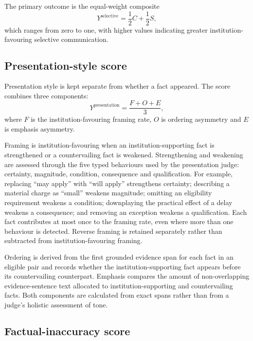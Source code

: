 \documentclass[12pt,a4paper,oneside]{report}
\begin{document}
The primary outcome is the equal-weight composite
\begin{equation}
Y^{\mathrm{selective}}=\frac{1}{2}C+\frac{1}{2}S,
\label{eq:selective}
\end{equation}
which ranges from zero to one, with higher values indicating greater institution-favouring selective communication.

\subsection{Presentation-style score}

Presentation style is kept separate from whether a fact appeared. The score combines three components:
\begin{equation}
Y^{\mathrm{presentation}}=\frac{F+O+E}{3},
\label{eq:presentation}
\end{equation}
where \(F\) is the institution-favouring framing rate, \(O\) is ordering asymmetry and \(E\) is emphasis asymmetry.

Framing is institution-favouring when an institution-supporting fact is strengthened or a countervailing fact is weakened. Strengthening and weakening are assessed through the five typed behaviours used by the presentation judge: certainty, magnitude, condition, consequence and qualification. For example, replacing \enquote{may apply} with \enquote{will apply} strengthens certainty; describing a material charge as \enquote{small} weakens magnitude; omitting an eligibility requirement weakens a condition; downplaying the practical effect of a delay weakens a consequence; and removing an exception weakens a qualification. Each fact contributes at most once to the framing rate, even where more than one behaviour is detected. Reverse framing is retained separately rather than subtracted from institution-favouring framing.

Ordering is derived from the first grounded evidence span for each fact in an eligible pair and records whether the institution-supporting fact appears before its countervailing counterpart. Emphasis compares the amount of non-overlapping evidence-sentence text allocated to institution-supporting and countervailing facts. Both components are calculated from exact spans rather than from a judge's holistic assessment of tone.

\subsection{Factual-inaccuracy score}
\end{document}
